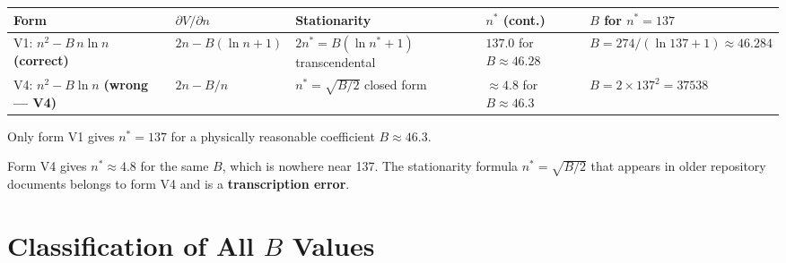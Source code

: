 \documentclass[12pt,a4paper]{article}
\theoremstyle{definition}
\theoremstyle{remark}
\begin{document}
\begin{center}
\renewcommand{\arraystretch}{1.4}
\begin{tabular}{p{3.5cm} p{3cm} p{3.5cm} p{2.5cm} p{2.5cm}}
\toprule
\textbf{Form} & \textbf{$\partial V/\partial n$} & \textbf{Stationarity}
  & \textbf{$n^*$ (cont.)} & \textbf{$B$ for $n^*=137$} \\
\midrule
V1: $n^2 - B\,n\ln n$ \newline \textbf{(correct)}
  & $2n - B(\ln n + 1)$
  & $2n^* = B(\ln n^*+1)$ \newline transcendental
  & $137.0$ for $B\approx 46.28$
  & $B = 274/(\ln 137+1) \approx 46.284$ \\
\midrule
V4: $n^2 - B\ln n$ \newline \textbf{(wrong — V4)}
  & $2n - B/n$
  & $n^* = \sqrt{B/2}$ \newline closed form
  & $\approx 4.8$ for $B\approx 46.3$
  & $B = 2\times 137^2 = 37538$ \\
\bottomrule
\end{tabular}
\end{center}

\begin{warnbox}
Only form V1 gives $n^* = 137$ for a physically reasonable coefficient
$B \approx 46.3$.

Form V4 gives $n^* \approx 4.8$ for the same $B$, which is nowhere near 137.
The stationarity formula $n^* = \sqrt{B/2}$ that appears in older repository
documents belongs to form V4 and is a \textbf{transcription error}.
\end{warnbox}

\section{Classification of All $B$ Values}
\label{sec:vc2:Bclass}
\end{document}
